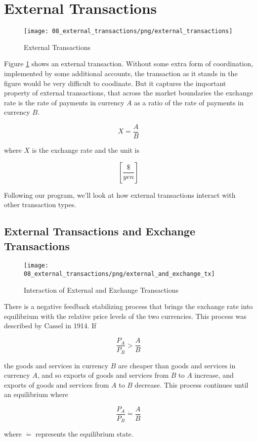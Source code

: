 \section{External Transactions}
\label{section:external_transactions}

\begin{figure}[H]
\centering
\texttt{[image: 08\_external\_transactions/png/external\_transactions]}
\caption{External Transactions}
\label{fig:external_transactions}
\end{figure}

Figure \ref{fig:external_transactions} shows an external transaction. Without some extra form of
coordination, implemented by some additional accounts, the transaction as it stands in the figure
would be very difficult to coodinate. But it captures the important property of external
transactions, that across the market boundaries the exchange rate is the rate of payments in
currency $A$ as a ratio of the rate of payments in currency $B$.

\[
    X = \frac A  B
\]


where $X$ is the exchange rate and the unit is

\[
    \left[ \frac {\$} {yen} \right]
\]

Following our program, we'll look at how external transactions interact with other transaction
types.

\subsection{External Transactions and Exchange Transactions}

\begin{figure}[H]
\centering
\texttt{[image: 08\_external\_transactions/png/external\_and\_exchange\_tx]}
\caption{Interaction of External and Exchange Transactions}
\label{fig:external_and_exchange_tx}
\end{figure}

There is a negative feedback stabilizing process that brings the exchange rate into equilibrium with
the relative price levels of the two currencies. This process was described by Cassel
\cite{cassel1914} in 1914. If   

\[
    \frac {P_A} {P_B} > \frac A B
\]

the goods and services in currency $B$ are cheaper than goods and services in currency $A$, and so
exports of goods and services from $B$ to $A$ increase, and exports of goods and services from $A$
to $B$ decrease. This process continues until an equilibrium where

\[
    \frac {P_A} {P_B} \dot{=} \frac A B
\]

where $\dot{=}$ represents the equilibrium state.

